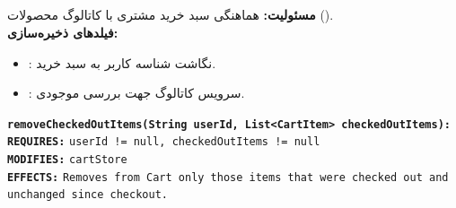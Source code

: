 \documentclass[11pt,a4paper]{article}
\begin{document}
\subsection{}
\textbf{مسئولیت:} هماهنگی سبد خرید مشتری با کاتالوگ محصولات ().\\
\textbf{فیلدهای ذخیره‌سازی:}
\begin{itemize}
    \item {}: نگاشت شناسه کاربر به سبد خرید.
    \item {}: سرویس کاتالوگ جهت بررسی موجودی.
\end{itemize}
\begin{contractbox}
\begin{latin}
\setlength{\parindent}{0pt}
\setlength{\parskip}{2pt}
\small
\textbf{\color{autnavy}\texttt{removeCheckedOutItems(String userId, List<CartItem> checkedOutItems):}} \\
\hspace*{1.5em}\textbf{\color{darkred}\texttt{REQUIRES:}} \texttt{userId != null, checkedOutItems != null} \\
\hspace*{1.5em}\textbf{\color{autblue}\texttt{MODIFIES:}} \texttt{cartStore} \\
\hspace*{1.5em}\textbf{\color{autteal}\texttt{EFFECTS:}}  \texttt{Removes from Cart only those items that were checked out and unchanged since checkout.}
\end{latin}
\end{contractbox}

\end{document}
